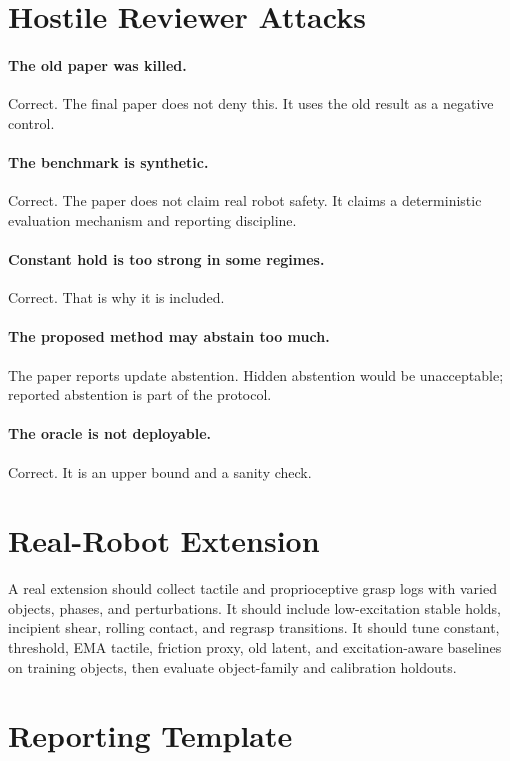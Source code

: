 \documentclass{article}
\begin{document}
\section{Hostile Reviewer Attacks}

\paragraph{The old paper was killed.}
Correct. The final paper does not deny this. It uses the old result as a negative control.

\paragraph{The benchmark is synthetic.}
Correct. The paper does not claim real robot safety. It claims a deterministic evaluation mechanism and reporting discipline.

\paragraph{Constant hold is too strong in some regimes.}
Correct. That is why it is included.

\paragraph{The proposed method may abstain too much.}
The paper reports update abstention. Hidden abstention would be unacceptable; reported abstention is part of the protocol.

\paragraph{The oracle is not deployable.}
Correct. It is an upper bound and a sanity check.

\section{Real-Robot Extension}

A real extension should collect tactile and proprioceptive grasp logs with varied objects, phases, and perturbations. It should include low-excitation stable holds, incipient shear, rolling contact, and regrasp transitions. It should tune constant, threshold, EMA tactile, friction proxy, old latent, and excitation-aware baselines on training objects, then evaluate object-family and calibration holdouts.

\section{Reporting Template}
\end{document}
